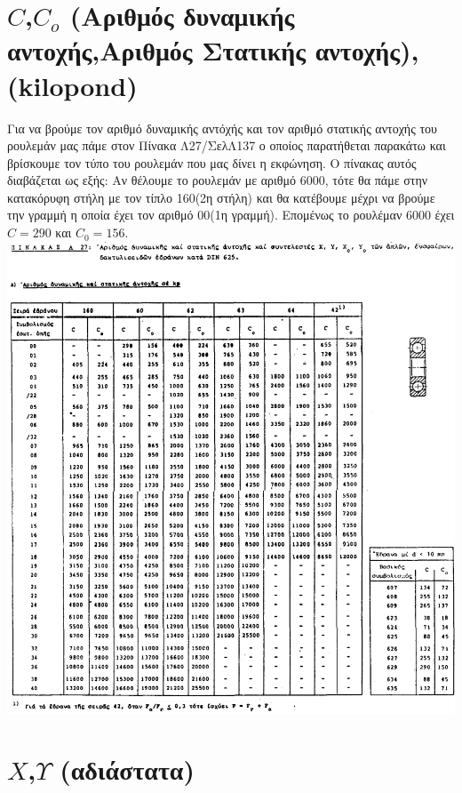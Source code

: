 \documentclass{article}
\begin{document}
\section{$C$,$C_o$ (Αριθμός δυναμικής αντοχής,Αριθμός Στατικής αντοχής),\small{(kilopond)}}

Για να βρούμε τον αριθμό δυναμικής αντόχής και τον αριθμό στατικής αντοχής του ρουλεμάν μας πάμε στον Πίνακα Λ27/ΣελΛ137 ο οποίος παρατήθεται παρακάτω και βρίσκουμε τον τύπο του ρουλεμάν που μας δίνει η εκφώνηση. Ο πίνακας αυτός διαβάζεται ως εξής: Αν θέλουμε το ρουλεμάν με αριθμό 6000, τότε θα πάμε στην κατακόρυφη στήλη με τον τίπλο 160(2η στήλη) και θα κατέβουμε μέχρι να βρούμε την γραμμή η οποία έχει τον αριθμό 00(1η γραμμή). Επομένως το ρουλέμαν 6000 έχει $C = 290$ και $C_0 = 156$.
\\
\includegraphics[width=\linewidth]{1.png}
\\

\section{$X$,$Υ$ \tiny{(αδιάστατα)}}
\end{document}
